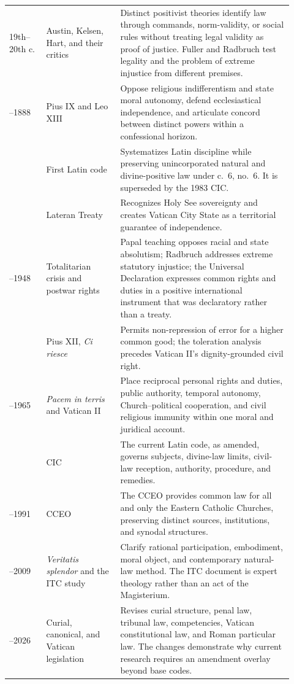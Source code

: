 \begin{longtable}{>{\bfseries\raggedright\arraybackslash}p{0.12\linewidth}>{\raggedright\arraybackslash}p{0.24\linewidth}>{\raggedright\arraybackslash}p{0.56\linewidth}}
19th--20th c. & Austin, Kelsen, Hart, and their critics & Distinct positivist theories identify law through commands, norm-validity, or social rules without treating legal validity as proof of justice. Fuller and Radbruch test legality and the problem of extreme injustice from different premises.\\
1864--1888 & Pius IX and Leo XIII & Oppose religious indifferentism and state moral autonomy, defend ecclesiastical independence, and articulate concord between distinct powers within a confessional horizon.\\
1917 & First Latin code & Systematizes Latin discipline while preserving unincorporated natural and divine-positive law under c.~6, no.~6. It is superseded by the 1983 CIC.\\
1929 & Lateran Treaty & Recognizes Holy See sovereignty and creates Vatican City State as a territorial guarantee of independence.\\
1937--1948 & Totalitarian crisis and postwar rights & Papal teaching opposes racial and state absolutism; Radbruch addresses extreme statutory injustice; the Universal Declaration expresses common rights and duties in a positive international instrument that was declaratory rather than a treaty.\\
1953 & Pius XII, \emph{Ci riesce} & Permits non-repression of error for a higher common good; the toleration analysis precedes Vatican II's dignity-grounded civil right.\\
1963--1965 & \emph{Pacem in terris} and Vatican II & Place reciprocal personal rights and duties, public authority, temporal autonomy, Church--political cooperation, and civil religious immunity within one moral and juridical account.\\
1983 & CIC & The current Latin code, as amended, governs subjects, divine-law limits, civil-law reception, authority, procedure, and remedies.\\
1990--1991 & CCEO & The CCEO provides common law for all and only the Eastern Catholic Churches, preserving distinct sources, institutions, and synodal structures.\\
1993--2009 & \emph{Veritatis splendor} and the ITC study & Clarify rational participation, embodiment, moral object, and contemporary natural-law method. The ITC document is expert theology rather than an act of the Magisterium.\\
2022--2026 & Curial, canonical, and Vatican legislation & Revises curial structure, penal law, tribunal law, competencies, Vatican constitutional law, and Roman particular law. The changes demonstrate why current research requires an amendment overlay beyond base codes.\\
\bottomrule
\end{longtable}
